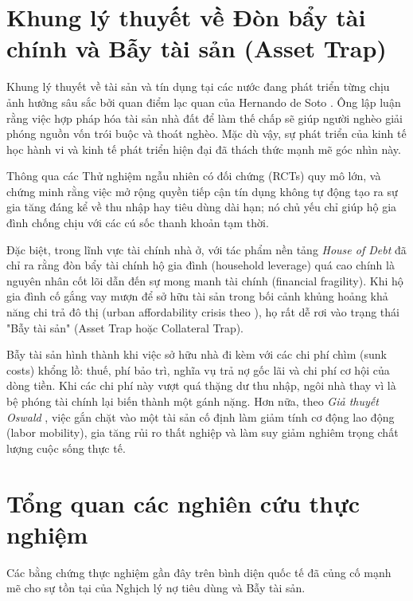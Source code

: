 \documentclass[12pt,a4paper]{report}
\begin{document}
\section{Khung lý thuyết về Đòn bẩy tài chính và Bẫy tài sản (Asset Trap)}

Khung lý thuyết về tài sản và tín dụng tại các nước đang phát triển từng chịu ảnh hưởng sâu sắc bởi quan điểm lạc quan của Hernando de Soto \parencite{deSoto2000}. Ông lập luận rằng việc hợp pháp hóa tài sản nhà đất để làm thế chấp sẽ giúp người nghèo giải phóng nguồn vốn trói buộc và thoát nghèo. Mặc dù vậy, sự phát triển của kinh tế học hành vi và kinh tế phát triển hiện đại đã thách thức mạnh mẽ góc nhìn này.

Thông qua các Thử nghiệm ngẫu nhiên có đối chứng (RCTs) quy mô lớn, \textcite{Banerjee2015} và \textcite{Karlan2010} chứng minh rằng việc mở rộng quyền tiếp cận tín dụng không tự động tạo ra sự gia tăng đáng kể về thu nhập hay tiêu dùng dài hạn; nó chủ yếu chỉ giúp hộ gia đình chống chịu với các cú sốc thanh khoản tạm thời.

Đặc biệt, trong lĩnh vực tài chính nhà ở, \textcite{Mian2014} với tác phẩm nền tảng \textit{House of Debt} đã chỉ ra rằng đòn bẩy tài chính hộ gia đình (household leverage) quá cao chính là nguyên nhân cốt lõi dẫn đến sự mong manh tài chính (financial fragility). Khi hộ gia đình cố gắng vay mượn để sở hữu tài sản trong bối cảnh khủng hoảng khả năng chi trả đô thị (urban affordability crisis theo \textcite{Glaeser2018}), họ rất dễ rơi vào trạng thái "Bẫy tài sản" (Asset Trap hoặc Collateral Trap). 

Bẫy tài sản hình thành khi việc sở hữu nhà đi kèm với các chi phí chìm (sunk costs) khổng lồ: thuế, phí bảo trì, nghĩa vụ trả nợ gốc lãi và chi phí cơ hội của dòng tiền. Khi các chi phí này vượt quá thặng dư thu nhập, ngôi nhà thay vì là bệ phóng tài chính lại biến thành một gánh nặng. Hơn nữa, theo \textit{Giả thuyết Oswald} \parencite{Oswald1996}, việc gắn chặt vào một tài sản cố định làm giảm tính cơ động lao động (labor mobility), gia tăng rủi ro thất nghiệp và làm suy giảm nghiêm trọng chất lượng cuộc sống thực tế.


\section{Tổng quan các nghiên cứu thực nghiệm}

Các bằng chứng thực nghiệm gần đây trên bình diện quốc tế đã củng cố mạnh mẽ cho sự tồn tại của Nghịch lý nợ tiêu dùng và Bẫy tài sản. 
\end{document}
